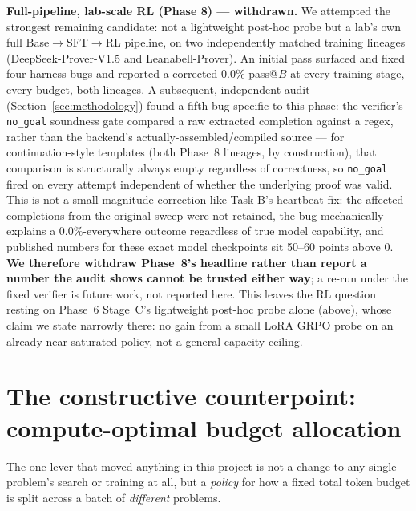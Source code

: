 \documentclass{article}
\begin{document}
\textbf{Full-pipeline, lab-scale RL (Phase 8) --- withdrawn.} We attempted the strongest remaining
candidate: not a lightweight post-hoc probe but a lab's own full Base$\to$SFT$\to$RL pipeline, on two
independently matched training lineages (DeepSeek-Prover-V1.5 and Leanabell-Prover). An initial pass
surfaced and fixed four harness bugs and reported a corrected 0.0\% pass@$B$ at every training stage,
every budget, both lineages. A subsequent, independent audit (Section~\ref{sec:methodology}) found a
fifth bug specific to this phase: the verifier's \texttt{no\_goal} soundness gate compared a raw
extracted completion against a regex, rather than the backend's actually-assembled/compiled source ---
for continuation-style templates (both Phase~8 lineages, by construction), that comparison is
structurally always empty regardless of correctness, so \texttt{no\_goal} fired on every attempt
independent of whether the underlying proof was valid. This is not a small-magnitude correction like
Task B's heartbeat fix: the affected completions from the original sweep were not retained, the bug
mechanically explains a 0.0\%-everywhere outcome regardless of true model capability, and published
numbers for these exact model checkpoints sit 50--60 points above 0. \textbf{We therefore withdraw
Phase~8's headline rather than report a number the audit shows cannot be trusted either way}; a
re-run under the fixed verifier is future work, not reported here. This leaves the RL question
resting on Phase~6 Stage~C's lightweight post-hoc probe alone (above), whose claim we state narrowly
there: no gain from a small LoRA GRPO probe on an already near-saturated policy, not a general
capacity ceiling.

\section{The constructive counterpoint: compute-optimal budget allocation}
\label{sec:allocation}

The one lever that moved anything in this project is not a change to any single problem's search or
training at all, but a \emph{policy} for how a fixed total token budget is split across a batch of
\emph{different} problems.
\end{document}
